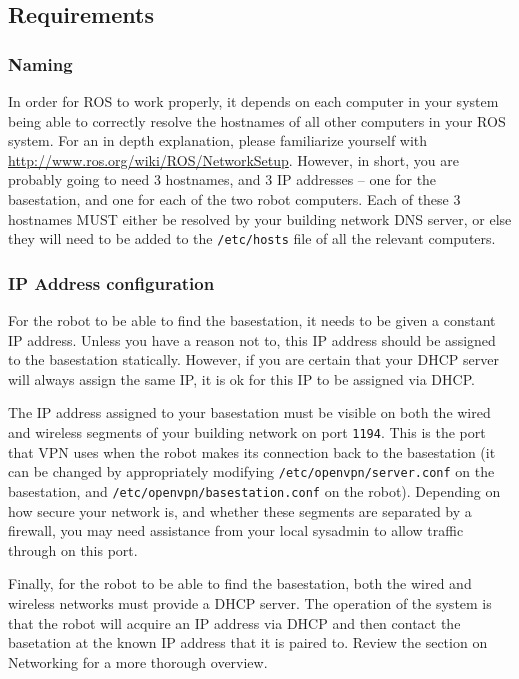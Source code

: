 \subsection{Requirements}

\subsubsection{Naming}
In order for ROS to work properly, it depends on each computer in your
system being able to correctly resolve the hostnames of all other
computers in your ROS system.  For an in depth explanation, please
familiarize yourself with
\href{http://www.ros.org/wiki/ROS/NetworkSetup}{http://www.ros.org/wiki/ROS/NetworkSetup}.
However, in short, you are probably going to need 3 hostnames, and 3
IP addresses -- one for the basestation, and one for each of the two
robot computers.  Each of these 3 hostnames MUST either be resolved by
your building network DNS server, or else they will need to be added
to the \texttt{/etc/hosts} file of all the relevant computers.

\subsubsection{IP Address configuration}
For the robot to be able to find the basestation, it needs to be given
a constant IP address.  Unless you have a reason not to, this IP
address should be assigned to the basestation statically.  However, if
you are certain that your DHCP server will always assign the same IP,
it is ok for this IP to be assigned via DHCP.

The IP address assigned to your basestation must be visible on both
the wired and wireless segments of your building network on port
\texttt{1194}.  This is the port that VPN uses when the robot makes
its connection back to the basestation (it can be changed by
appropriately modifying \texttt{/etc/openvpn/server.conf} on the
basestation, and \texttt{/etc/openvpn/basestation.conf} on the robot).
Depending on how secure your network is, and whether these segments
are separated by a firewall, you may need assistance from your local
sysadmin to allow traffic through on this port.

Finally, for the robot to be able to find the basestation, both the
wired and wireless networks must provide a DHCP server.  The operation
of the system is that the robot will acquire an IP address via DHCP
and then contact the basetation at the known IP address that it is
paired to.  Review the section on Networking for a more thorough
overview.

